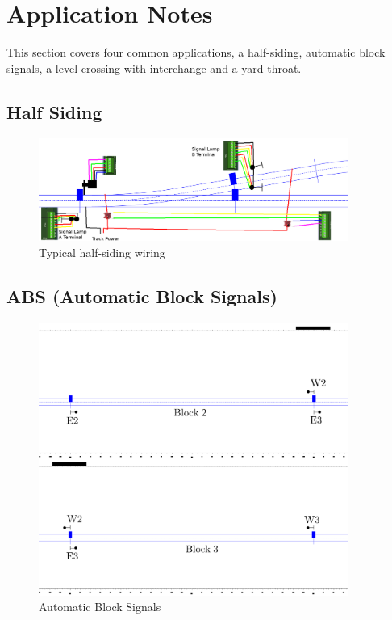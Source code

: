 \clearpage
\section{Application Notes}

This section covers four common applications, a half-siding, automatic block 
signals, a level crossing with interchange and a yard throat.

\subsection{Half Siding}
\label{sec:HalfSiding}
\begin{figure}[hbpt]\begin{centering}%
\includegraphics[width=4in]{ESP32S3-ExampleSidingCP1Wiring.png}
\caption{Typical half-siding wiring}
\label{fig:ExampleSidingCP1Wiring}
\end{centering}\end{figure}


\subsection{ABS (Automatic Block Signals)}
\label{sec:ABS}
\begin{figure}[hbpt]\begin{centering}%
\includegraphics[width=4in]{ESP32S3-ABSTrack_Stacked.png}
\caption{Automatic Block Signals}
\label{fig:ABSTrackStacked}
\end{centering}\end{figure}




